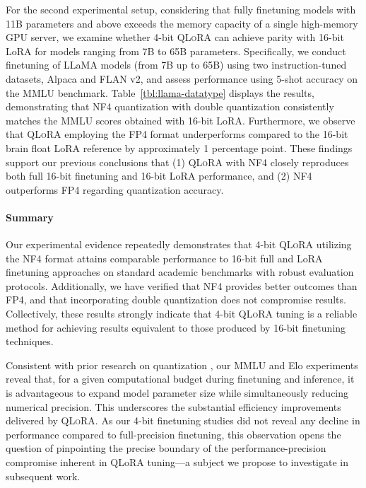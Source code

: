 For the second experimental setup, considering that fully finetuning models with 11B parameters and above exceeds the memory capacity of a single high-memory GPU server, we examine whether 4-bit \textsc{QLoRA} can achieve parity with 16-bit LoRA for models ranging from 7B to 65B parameters. Specifically, we conduct finetuning of LLaMA models (from 7B up to 65B) using two instruction-tuned datasets, Alpaca and FLAN v2, and assess performance using 5-shot accuracy on the MMLU benchmark. Table~\ref{tbl:llama-datatype} displays the results, demonstrating that NF4 quantization with double quantization consistently matches the MMLU scores obtained with 16-bit LoRA. Furthermore, we observe that \textsc{QLoRA} employing the FP4 format underperforms compared to the 16-bit brain float LoRA reference by approximately 1 percentage point. These findings support our previous conclusions that (1) \textsc{QLoRA} with NF4 closely reproduces both full 16-bit finetuning and 16-bit LoRA performance, and (2) NF4 outperforms FP4 regarding quantization accuracy.

\paragraph{Summary} Our experimental evidence repeatedly demonstrates that 4-bit \textsc{QLoRA} utilizing the NF4 format attains comparable performance to 16-bit full and LoRA finetuning approaches on standard academic benchmarks with robust evaluation protocols. Additionally, we have verified that NF4 provides better outcomes than FP4, and that incorporating double quantization does not compromise results. Collectively, these results strongly indicate that 4-bit \textsc{QLoRA} tuning is a reliable method for achieving results equivalent to those produced by 16-bit finetuning techniques.

Consistent with prior research on quantization \citep{dettmers2022case}, our MMLU and Elo experiments reveal that, for a given computational budget during finetuning and inference, it is advantageous to expand model parameter size while simultaneously reducing numerical precision. This underscores the substantial efficiency improvements delivered by \textsc{QLoRA}. As our 4-bit finetuning studies did not reveal any decline in performance compared to full-precision finetuning, this observation opens the question of pinpointing the precise boundary of the performance-precision compromise inherent in QLoRA tuning—a subject we propose to investigate in subsequent work.


